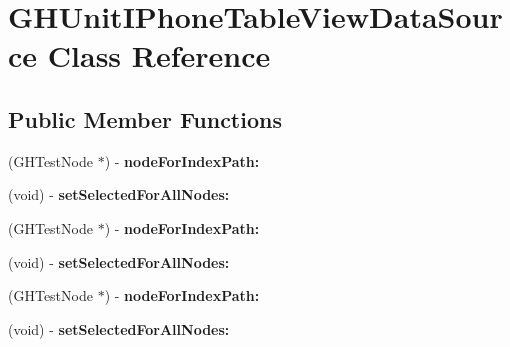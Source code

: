 \hypertarget{interface_g_h_unit_i_phone_table_view_data_source}{
\section{\-G\-H\-Unit\-I\-Phone\-Table\-View\-Data\-Source \-Class \-Reference}
\label{interface_g_h_unit_i_phone_table_view_data_source}
}
\subsection*{\-Public \-Member \-Functions}
\begin{DoxyCompactItemize}
\item 
\hypertarget{interface_g_h_unit_i_phone_table_view_data_source_ad0ff09714e04713e14cce29f86c18c1d}{
(\-G\-H\-Test\-Node $\ast$) -\/ {\bfseries node\-For\-Index\-Path\-:}}
\label{interface_g_h_unit_i_phone_table_view_data_source_ad0ff09714e04713e14cce29f86c18c1d}

\item 
\hypertarget{interface_g_h_unit_i_phone_table_view_data_source_ad9d70b9269f28bb22a7c5be1e35b2ae0}{
(void) -\/ {\bfseries set\-Selected\-For\-All\-Nodes\-:}}
\label{interface_g_h_unit_i_phone_table_view_data_source_ad9d70b9269f28bb22a7c5be1e35b2ae0}

\item 
\hypertarget{interface_g_h_unit_i_phone_table_view_data_source_ad0ff09714e04713e14cce29f86c18c1d}{
(\-G\-H\-Test\-Node $\ast$) -\/ {\bfseries node\-For\-Index\-Path\-:}}
\label{interface_g_h_unit_i_phone_table_view_data_source_ad0ff09714e04713e14cce29f86c18c1d}

\item 
\hypertarget{interface_g_h_unit_i_phone_table_view_data_source_ad9d70b9269f28bb22a7c5be1e35b2ae0}{
(void) -\/ {\bfseries set\-Selected\-For\-All\-Nodes\-:}}
\label{interface_g_h_unit_i_phone_table_view_data_source_ad9d70b9269f28bb22a7c5be1e35b2ae0}

\item 
\hypertarget{interface_g_h_unit_i_phone_table_view_data_source_ad0ff09714e04713e14cce29f86c18c1d}{
(\-G\-H\-Test\-Node $\ast$) -\/ {\bfseries node\-For\-Index\-Path\-:}}
\label{interface_g_h_unit_i_phone_table_view_data_source_ad0ff09714e04713e14cce29f86c18c1d}

\item 
\hypertarget{interface_g_h_unit_i_phone_table_view_data_source_ad9d70b9269f28bb22a7c5be1e35b2ae0}{
(void) -\/ {\bfseries set\-Selected\-For\-All\-Nodes\-:}}
\label{interface_g_h_unit_i_phone_table_view_data_source_ad9d70b9269f28bb22a7c5be1e35b2ae0}


\end{DoxyCompactItemize}
